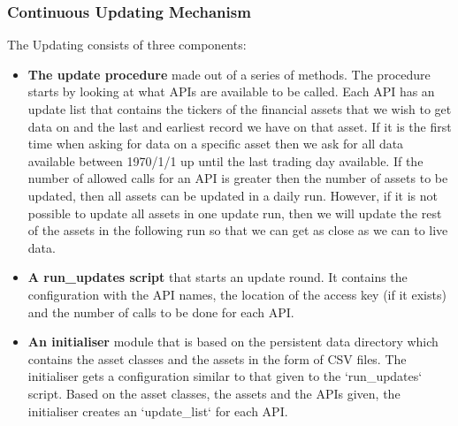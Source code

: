 \documentclass[main.tex]{subfiles}
\begin{document}
\subsubsection{Continuous Updating Mechanism}
The Updating consists of three components:
\begin{itemize}
    \item \textbf{The update procedure} made out of a series of methods. The procedure starts by looking at what APIs are available to be called. Each API has an update list that contains the tickers of the financial assets that we wish to get data on and the last and earliest record we have on that asset. If it is the first time when asking for data on a specific asset then we ask for all data available between 1970/1/1 up until the last trading day available. If the number of allowed calls for an API is greater then the number of assets to be updated, then all assets can be updated in a daily run. However, if it is not possible to update all assets in one update run, then we will update the rest of the assets in the following run so that we can get as close as we can to live data.
    \item \textbf{A run\_updates script} that starts an update round. It contains the configuration with the API names, the location of the access key (if it exists) and the number of calls to be done for each API.
    \item \textbf{An initialiser} module that is based on the persistent data directory which contains the asset classes and the assets in the form of CSV files. The initialiser gets a configuration similar to that given to the `run\_updates` script. Based on the asset classes, the assets and the APIs given, the initialiser creates an `update\_list` for each API.
\end{itemize}
\end{document}
